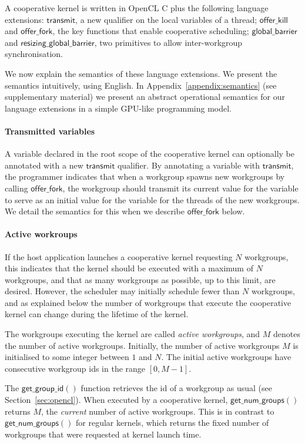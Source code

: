 \documentclass[numbers,nocopyrightspace,10pt]{sigplanconf}
\newcommand{\transmit}{\mathsf{transmit}}
\newcommand{\offerfork}{\mathsf{offer\_fork}}
\newcommand{\offerkill}{\mathsf{offer\_kill}}
\newcommand{\globalbarrier}{\mathsf{global\_barrier}}
\newcommand{\resizingglobalbarrier}{\mathsf{resizing\_global\_barrier}}
\newcommand{\getgroupid}{\mathsf{get\_group\_id}}
\newcommand{\getnumgroups}{\mathsf{get\_num\_groups}}
\begin{document}
A cooperative kernel is written in OpenCL C plus the following
language extensions: $\transmit$, a
new qualifier on the local variables of a thread; $\offerkill$ and
$\offerfork$, the key functions that enable cooperative scheduling;
$\globalbarrier$ and $\resizingglobalbarrier$, two primitives to allow
inter-workgroup synchronisation.

We now explain the semantics of these language extensions.  We present the semantics intuitively, using English.
In Appendix~\ref{appendix:semantics} (see supplementary material) we present an abstract operational semantics for our language extensions in a simple GPU-like programming model.

\paragraph{Transmitted variables}

A variable declared in the root scope of the cooperative kernel can
optionally be annotated with a new $\transmit$ qualifier.  By
annotating a variable with $\transmit$, the programmer indicates that
when a workgroup spawns new workgroups by calling $\offerfork$, the
workgroup should transmit its current value for the variable to serve
as an initial value for the variable for the threads of the new workgroups.  We detail the semantics
for this when we describe $\offerfork$ below.

\paragraph{Active workroups}

If the host application launches a cooperative kernel requesting $N$
workgroups, this indicates that the kernel should be executed with a
maximum of $N$ workgroups, and that as many workgroups as possible, up
to this limit, are desired.  However, the scheduler may initially
schedule fewer than $N$ workgroups, and as explained below the number
of workgroups that execute the cooperative kernel can change during
the lifetime of the kernel.

The workgroups executing the kernel are called \emph{active
  workgroups}, and $M$ denotes the number of active workgroups.
Initially, the number of active workgroups $M$ is initialised to some
integer between $1$ and $N$.  The initial active workgroups have
consecutive workgroup ids in the range $[0, M-1]$.

The $\getgroupid()$ function retrieves the id of a workgroup as usual
(see Section~\ref{sec:opencl}).  When executed by a cooperative
kernel, $\getnumgroups()$ returns $M$, the \emph{current} number of
active workgroups.  This is in contrast to $\getnumgroups()$ for
regular kernels, which returns the fixed number of workgroups that
were requested at kernel launch time.
\end{document}
